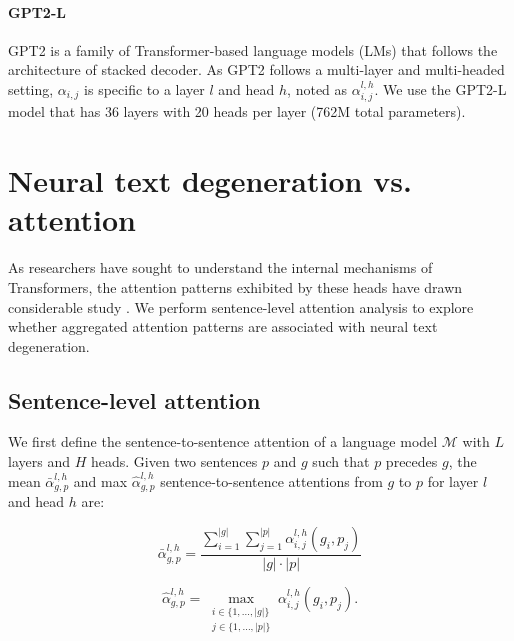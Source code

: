 \documentclass[11pt,a4paper]{article}
\begin{document}
\paragraph{GPT2-L} GPT2 \citep{radford2019language} is a family of Transformer-based language models (LMs) that follows the architecture of stacked decoder.  %
As GPT2 follows a multi-layer and multi-headed setting, $\alpha_{i,j}$ is specific to a layer $l$ and head $h$, noted as $\alpha_{i,j}^{l,h}$. We use the GPT2-L model that has 36 layers with 20 heads per layer (762M total parameters).




\section{Neural text degeneration vs. attention}\label{sec:motivation}
As researchers have sought to understand the internal mechanisms of Transformers, the attention patterns exhibited by these heads have drawn considerable study \citep{vig-belinkov-2019-analyzing,jain2019attention,wiegreffe2019attention}. We perform sentence-level attention analysis to explore whether aggregated attention patterns are associated with neural text degeneration. 

\subsection{Sentence-level attention}  We first define the sentence-to-sentence attention of a language model $\mathcal{M}$ with $L$ layers and $H$ heads. Given two sentences $p$ and $g$ such that $p$ precedes $g$, the mean $\bar{\alpha}^{l,h}_{g,p}$ and max $\hat{\alpha}^{l,h}_{g,p}$ sentence-to-sentence attentions from  $g$ to  $p$ for layer $l$ and head $h$ are: 

\begin{equation} 
\label{eq:mean_sent_to_sent_attention}
      \bar{\alpha}^{l,h}_{g,p} =\frac{\sum\limits_{i=1}^{|g|}\sum\limits_{j=1}^{|p|}\alpha^{l,h}_{i,j}(g_i,p_j)}
    {|g| \cdot |p|}
\end{equation}

\begin{equation}
\label{eq:max_sent_to_sent_attention}
     \hat{\alpha}^{l,h}_{g,p} =\max_{\substack{i \in \{1,\ldots,|g|\} \\ j \in \{1,\ldots,|p|\}}}\alpha^{l,h}_{i,j}(g_i,p_j).
\end{equation}
\end{document}

